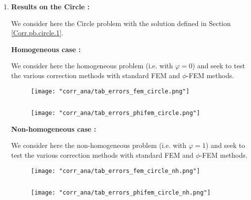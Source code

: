 \begin{enumerate}[label=\textbullet]
	\item \textbf{Results on the Circle :}
	
	We consider here the Circle problem with the solution defined in Section \ref{Corr.pb.circle.1}.
	
	\textbf{Homogeneous case :}
	
	We consider here the homogeneous problem (i.e. with $\varphi=0$) and seek to test the various correction methods with standard FEM and $\phi$-FEM methods.
	
	\begin{minipage}{0.48\linewidth}
		\begin{figure}[H]
			\centering
			\texttt{[image: "corr\_ana/tab\_errors\_fem\_circle.png"]}
			\label{tab_errors_fem_circle}
		\end{figure} 
	\end{minipage} $\qquad$
	\begin{minipage}{0.48\linewidth} \qquad 
		\begin{figure}[H]
			\centering
			\texttt{[image: "corr\_ana/tab\_errors\_phifem\_circle.png"]}
			\label{tab_errors_phifem_circle}
		\end{figure} 
	\end{minipage}
	
	\textbf{Non-homogeneous case :}
	
	We consider here the non-homogeneous problem (i.e. with $\varphi=1$) and seek to test the various correction methods with standard FEM and $\phi$-FEM methods.
	
	\begin{minipage}{0.48\linewidth}
		\begin{figure}[H]
			\centering
			\texttt{[image: "corr\_ana/tab\_errors\_fem\_circle\_nh.png"]}
			\label{tab_errors_fem_circle_nh}
		\end{figure} 
	\end{minipage} $\qquad$
	\begin{minipage}{0.48\linewidth} \qquad 
		\begin{figure}[H]
			\centering
			\texttt{[image: "corr\_ana/tab\_errors\_phifem\_circle\_nh.png"]}
			\label{tab_errors_phifem_circle_nh}
		\end{figure} 
	\end{minipage}
	

\end{enumerate}
